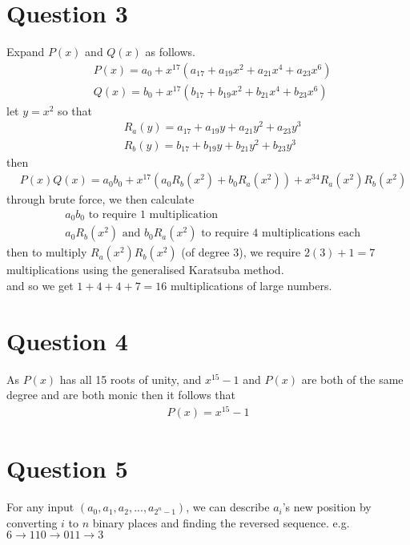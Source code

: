 \documentclass{article}
\begin{document}
\section*{Question 3}
Expand $P(x)$ and $Q(x)$ as follows.
\begin{align*}
    & P(x) = a_0 + x^{17}(a_{17} + a_{19}x^{2} + a_{21}x^4 + a_{23}x^6)\\
    & Q(x) = b_0 + x^{17}(b_{17} + b_{19}x^{2} + b_{21}x^4 + b_{23}x^6)
\end{align*}
let $y = x^2$ so that
\begin{align*}
    & R_a(y) = a_{17} + a_{19}y + a_{21}y^2 + a_{23}y^3\\
    & R_b(y) = b_{17} + b_{19}y + b_{21}y^2 + b_{23}y^3
\end{align*}
then
\begin{align*}
    & P(x)Q(x) = a_0b_0 + x^{17}(a_0R_b(x^2) + b_0R_a(x^2)) + x^{34}R_a(x^2)R_b(x^2)
\end{align*}
through brute force, we then calculate
\begin{align*}
    & a_0b_0 \text{ to require 1 multiplication}\\
    & a_0R_b(x^2) \text{ and } b_0R_a(x^2) \text{ to require 4 multiplications each}
\end{align*}
then to multiply $R_a(x^2)R_b(x^2)$ (of degree 3), we require $2(3)+1 = 7$ multiplications using the generalised Karatsuba method.\\
and so we get $1 + 4 + 4 + 7 = 16$ multiplications of large numbers.

\section*{Question 4}
As $P(x)$ has all 15 roots of unity, and $x^{15} - 1$ and $P(x)$ are both of the same degree and are both monic then it follows that
\begin{gather*}
P(x) = x^{15} -1
\end{gather*}

\section*{Question 5}
For any input $(a_0, a_1, a_2, ..., a_{2^n-1})$, we can describe $a_i$'s new position by converting $i$ to $n$ binary places and finding the reversed sequence.
e.g. $6 \rightarrow 110 \rightarrow 011 \rightarrow 3$
\end{document}
